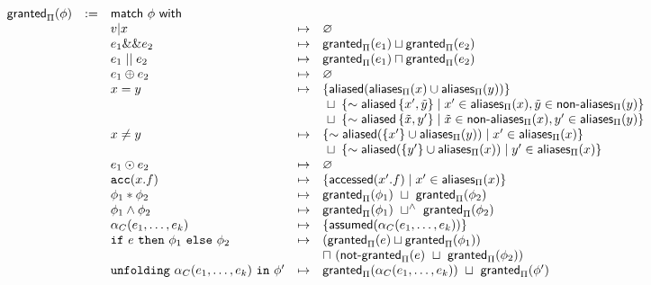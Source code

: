 \begin{align*}
\begin{array}{rclrl}
\tsf{granted}_\Pi(\phi) & := & \tsf{match} \ \phi \ \tsf{with} && \\
%
%
&& v | x &\mt&
  \empty
\\
&& e_1 \band e_2 &\mt&
  \grantedPi(e_1) \merge \grantedPi(e_2)
\\
&& e_1 \bor e_2 &\mt&
  \grantedPi(e_1) \overlap \grantedPi(e_2)
\\
&& e_1 \oplus e_2 &\mt&
  \empty %
\\
&& x = y &\mt&
  \set{ \aliased(\aliasesPi(x) \cup \aliasesPi(y)) }
  \\ &&&& \ \merge \
  \set{ \pnot \aliased\set{ x\p, \tilde y }
    \mid x\p \in \aliasesPi(x), \tilde y \in \nonaliasesPi(y) }
  \\ &&&& \ \merge \
  \set{ \pnot \aliased\set{ \tilde x, y\p }
    \mid \tilde x \in \nonaliasesPi(x), y\p \in \aliasesPi(y) }
\\
&& x \neq y &\mt&
  \set{ \pnot \aliased(\set{ x\p } \cup \aliasesPi(y)) \mid x\p \in \aliasesPi(x) }
  \\ &&&& \ \merge \
  \set{ \pnot \aliased(\set{ y\p } \cup \aliasesPi(x)) \mid y\p \in \aliasesPi(x) }
\\
&& e_1 \odot e_2 &\mt&
  \empty
\\
&& \cacc(x.f) &\mt&
  \set{ \accessed(x\p.f) \mid x\p \in \aliasesPi(x) }
\\
&& \phi_1 \ast \phi_2 &\mt&
  \tsf{granted}_\Pi(\phi_1) \ \merge \ \tsf{granted}_\Pi(\phi_2)
\\
&& \phi_1 \land \phi_2 &\mt&
  \tsf{granted}_\Pi(\phi_1) \ \merge^\land \ \tsf{granted}_\Pi(\phi_2)
\\
&& \alpha_C(e_1, \dots, e_k) &\mt&
  \set{ \assumed(\alpha_C(e_1, \dots, e_k)) }
\\
&& \cif \ e \ \cthen \ \phi_1 \ \celse \ \phi_2 &\mt&
  (\tsf{granted}_\Pi(e) \merge \tsf{granted}_\Pi(\phi_1)) \\ &&&& \overlap \
  (\notgrantedPi(e) \ \merge \ \tsf{granted}_\Pi(\phi_2))
\\
&& \cunfolding \ \alpha_C(e_1, \dots, e_k) \ \cin \ \phi\p &\mt&
  \grantedPi(\alpha_C(e_1, \dots, e_k)) \ \merge \
  \grantedPi(\phi\p)
\end{array}
\end{align*}

